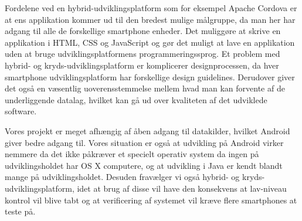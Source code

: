Fordelene ved en hybrid-udviklingsplatform som for eksempel Apache Cordova er at ens applikation kommer ud til den bredest mulige målgruppe, da man her har adgang til alle de forskellige smartphone enheder.
Det muliggøre at skrive en applikation i HTML, CSS og JavaScript og gør det muligt at lave en applikation uden at bruge udviklingsplatformens programmeringssprog.
Et problem med hybrid- og kryds-udviklingsplatform er komplicerer designprocessen, da hver smartphone udviklingsplatform har forskellige design guidelines.
Derudover giver det også en væsentlig uoverensstemmelse mellem hvad man kan forvente af de underliggende datalag, hvilket kan gå ud over kvaliteten af det udviklede software.

Vores projekt er meget afhængig af åben adgang til datakilder, hvilket Android giver bedre adgang til.
Vores situation er også at udvikling på Android virker nemmere da det ikke påkræver et specielt operativ system da ingen på udviklingsholdet har OS X computere, og at udvikling i Java er kendt blandt mange på udviklingsholdet.
Desuden fravælger vi også hybrid- og kryds-udviklingsplatform, idet at brug af disse vil have den konsekvens at lav-niveau kontrol vil blive tabt og at verificering af systemet vil kræve flere smartphones at teste på.
